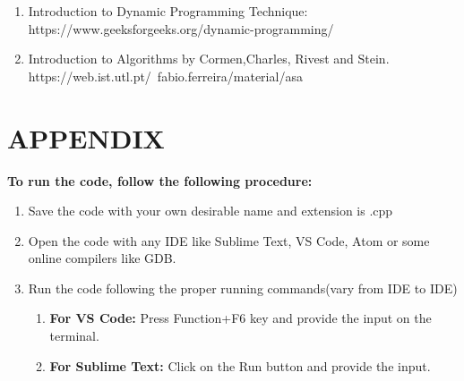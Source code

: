 \documentclass[10pt]{article}
\begin{document}
\begin{multicols*}{2}
\begin{enumerate}
\item Introduction to Dynamic Programming Technique:\\
https://www.geeksforgeeks.org/dynamic-programming/
\item Introduction to Algorithms by Cormen,Charles, Rivest and Stein.\\
https://web.ist.utl.pt/~fabio.ferreira/material/asa
\end{enumerate}



\newpage
\section*{APPENDIX}
\textbf{To run the code, follow the following procedure:}\\
\begin{enumerate}
    \item Save the code with your own desirable name and extension is .cpp
    \item Open the code with any IDE like Sublime Text, VS Code, Atom or some online compilers like GDB.
    \item Run the code following the proper running commands(vary from IDE to IDE)
    \begin{enumerate}
        \item \textbf{For VS Code:} Press Function+F6 key and provide the input on the terminal.
        \item \textbf{For Sublime Text:} Click on the Run button and provide the input.\\
    \end{enumerate}
\end{enumerate}
\end{multicols*}
	
\end{document}

